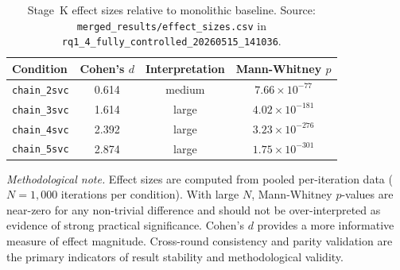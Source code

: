 \begin{table}[ht]
\centering
\caption[Stage~K effect sizes vs.\ monolithic baseline]{Stage~K effect sizes relative to monolithic baseline. Source: \texttt{merged\_results/effect\_sizes.csv} in \texttt{rq1\_4\_fully\_controlled\_20260515\_141036}.}
\label{tab:rq14_effects}
\begin{tabular}{lccc}
\toprule
\textbf{Condition} & \textbf{Cohen's $d$} & \textbf{Interpretation} & \textbf{Mann-Whitney $p$} \\
\midrule
\texttt{chain\_2svc} & 0.614 & medium & $7.66 \times 10^{-77}$ \\
\texttt{chain\_3svc} & 1.614 & large  & $4.02 \times 10^{-181}$ \\
\texttt{chain\_4svc} & 2.392 & large  & $3.23 \times 10^{-276}$ \\
\texttt{chain\_5svc} & 2.874 & large  & $1.75 \times 10^{-301}$ \\
\bottomrule
\end{tabular}
\end{table}

\noindent
\textit{Methodological note.} Effect sizes are computed from pooled per-iteration data
($N = 1{,}000$ iterations per condition). With large $N$, Mann-Whitney $p$-values are
near-zero for any non-trivial difference and should not be over-interpreted as evidence of
strong practical significance. Cohen's $d$ provides a more informative measure of effect
magnitude. Cross-round consistency and parity validation are the primary indicators of
result stability and methodological validity.

\begin{table}[ht]
\centering
\caption[Stage~K cross-round consistency]{Stage~K cross-round consistency. Source: \texttt{merged\_results/round\_consistency.json} in \texttt{rq1\_4\_fully\_controlled\_20260515\_141036}.}
\label{tab:rq14_rounds}
\end{table}

